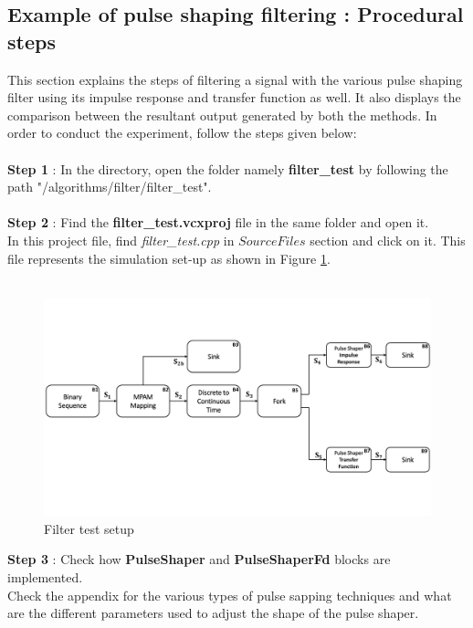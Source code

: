 \begin{refsection}
\subsection*{Example of pulse shaping filtering : Procedural steps}
This section explains the steps of filtering a signal with the various pulse shaping filter using its impulse response and transfer function as well. It also displays the comparison between the resultant output generated by both the methods. In order to conduct the experiment, follow the steps given below:\\ \\
\textbf{Step 1} : In the directory, open the folder namely \textbf{filter\_test} by following the path  "/algorithms/filter/filter\_test".\\ \\
\textbf{Step 2} : Find the \textbf{filter\_test.vcxproj} file in the same folder and open it.\\
In this project file, find \textit{filter\_test.cpp} in $Source Files$ section and click on it. This file represents the simulation set-up as shown in Figure \ref{FilterTest}. \\ \\
\begin{figure}[h]
	\centering
	\includegraphics[width=16cm]{./algorithms/filter/figures/Test_Filter_Dia.pdf}
	\caption{Filter test setup}
	\label{FilterTest}
\end{figure}
\textbf{Step 3} : Check how \textbf{PulseShaper} and  \textbf{PulseShaperFd} blocks are implemented.\\
Check the appendix for the various types of pulse sapping techniques and what are the different parameters used to adjust the shape of the pulse shaper.\\ \\
%

\end{refsection}
